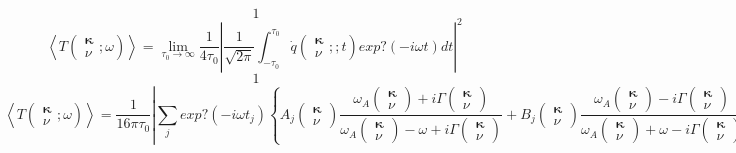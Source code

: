 \[1\] 
\[\left\langle T\left( \begin{array}{c}
{\mathbf \kappa } \\ 
\nu  \end{array}
;\omega \right)\right\rangle ={\mathop{lim}_{{\tau }_0\to \infty } \frac{1}{4{\tau }_0}{\left|\frac{1}{\sqrt{2\pi }}\int\nolimits^{{\tau }_0}_{-{\tau }_0}{\dot{q}\left( \begin{array}{c}
{\mathbf \kappa } \\ 
\nu  \end{array}
;;t\right)exp?(-i\omega t)dt}\right|}^2\ }\] 
\[1\] 
\[\left\langle T\left( \begin{array}{c}
{\mathbf \kappa } \\ 
\nu  \end{array}
;\omega \right)\right\rangle =\frac{1}{16\pi {\tau }_0}{\left|\sum\limits_j{exp?(-i\omega t_j)\left\{A_j\left( \begin{array}{c}
{\mathbf \kappa } \\ 
\nu  \end{array}
\right)\frac{{\omega }_A\left( \begin{array}{c}
{\mathbf \kappa } \\ 
\nu  \end{array}
\right)+i\Gamma \left( \begin{array}{c}
{\mathbf \kappa } \\ 
\nu  \end{array}
\right)}{{\omega }_A\left( \begin{array}{c}
{\mathbf \kappa } \\ 
\nu  \end{array}
\right)-\omega +i\Gamma \left( \begin{array}{c}
{\mathbf \kappa } \\ 
\nu  \end{array}
\right)}+B_j\left( \begin{array}{c}
{\mathbf \kappa } \\ 
\nu  \end{array}
\right)\frac{{\omega }_A\left( \begin{array}{c}
{\mathbf \kappa } \\ 
\nu  \end{array}
\right)-i\Gamma \left( \begin{array}{c}
{\mathbf \kappa } \\ 
\nu  \end{array}
\right)}{{\omega }_A\left( \begin{array}{c}
{\mathbf \kappa } \\ 
\nu  \end{array}
\right)+\omega -i\Gamma \left( \begin{array}{c}
{\mathbf \kappa } \\ 
\nu  \end{array}
\right)}\right\}}\right|}^2\] 
